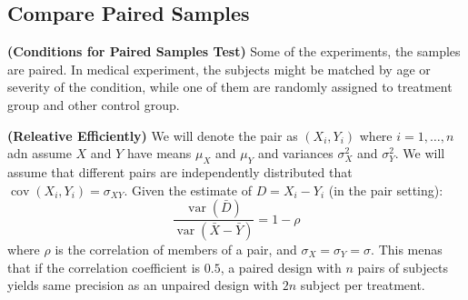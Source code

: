 \subsection{Compare Paired Samples}

\begin{remark}{\textbf{(Conditions for Paired Samples Test)}}
    Some of the experiments, the samples are paired. In medical experiment, the subjects might be matched by age or severity of the condition, while one of them are randomly assigned to treatment group and other control group. 
\end{remark}

\begin{proposition}{\textbf{(Releative Efficiently)}}
    We will denote the pair as $(X_i, Y_i)$ where $i=1,\dots,n$ adn assume $X$ and $Y$ have means $\mu_X$ and $\mu_Y$ and variances $\sigma^2_X$ and $\sigma^2_Y$. We will assume that different pairs are independently distributed that $\operatorname{cov}(X_i, Y_i) = \sigma_{XY}$. Given the estimate of $D = X_i - Y_i$ (in the pair setting):
    \begin{equation*}
        \frac{\operatorname{var}(\bar{D})}{\operatorname{var}(\bar{X} - \bar{Y})} = 1-\rho
    \end{equation*}
    where $\rho$ is the correlation of members of a pair, and $\sigma_X=\sigma_Y=\sigma$. This menas that if the correlation coefficient is $0.5$, a paired design with $n$ pairs of subjects yields same precision as an unpaired design with $2n$ subject per treatment. 
\end{proposition}
